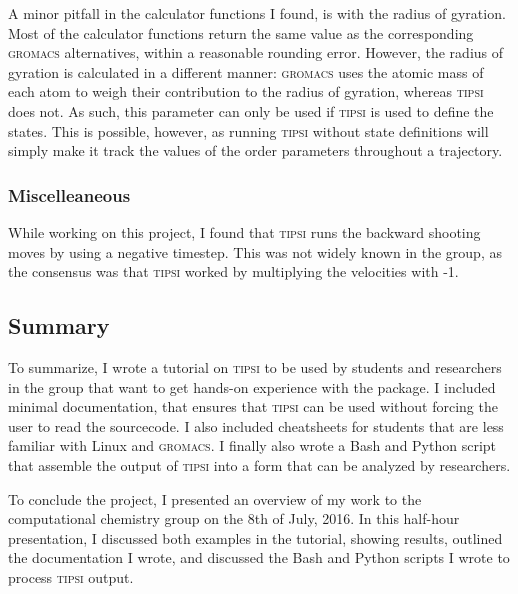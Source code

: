 \documentclass[]{article}
\begin{document}
A minor pitfall in the calculator functions I found, is with the radius of gyration. Most of the calculator functions return the same value as the corresponding \textsc{gromacs} alternatives, within a reasonable rounding error. However, the radius of gyration is calculated in a different manner: \textsc{gromacs} uses the atomic mass of each atom to weigh their contribution to the radius of gyration, whereas \textsc{tipsi} does not. As such, this parameter can only be used if \textsc{tipsi} is used to define the states. This is possible, however, as running \textsc{tipsi} without state definitions will simply make it track the values of the order parameters throughout a trajectory. 

\subsubsection*{Miscelleaneous}

While working on this project, I found that \textsc{tipsi} runs the backward shooting moves by using a negative timestep. This was not widely known in the group, as the consensus was that \textsc{tipsi} worked by multiplying the velocities with -1.

\subsection*{Summary}

To summarize, I wrote a tutorial on \textsc{tipsi} to be used by students and researchers in the group that want to get hands-on experience with the package. I included minimal documentation, that ensures that \textsc{tipsi} can be used without forcing the user to read the sourcecode. I also included cheatsheets for students that are less familiar with Linux and \textsc{gromacs}. I finally also wrote a Bash and Python script that assemble the output of \textsc{tipsi} into a form that can be analyzed by researchers.

To conclude the project, I presented an overview of my work to the computational chemistry group on the 8th of July, 2016. In this half-hour presentation, I discussed both examples in the tutorial, showing results, outlined the documentation I wrote, and discussed the Bash and Python scripts I wrote to process \textsc{tipsi} output.



\end{document}

